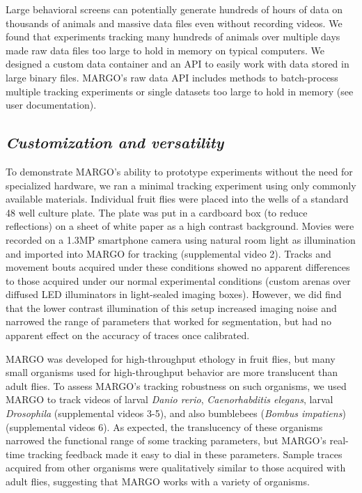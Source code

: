 \documentclass[10pt]{article}
\begin{document}
\begin{multicols}{2}
Large behavioral screens can potentially generate hundreds of hours of data on thousands of animals and massive data files even without recording videos. We found that experiments tracking many hundreds of animals over multiple days made raw data files too large to hold in memory on typical computers. We designed a custom data container and an API to easily work with data stored in large binary files. MARGO's raw data API includes methods to batch-process multiple tracking experiments or single datasets too large to hold in memory (see user documentation). 

\subsection*{\textit{Customization and versatility}}

To demonstrate MARGO's ability to prototype experiments without the need for specialized hardware, we ran a minimal tracking experiment using only commonly available materials. Individual fruit flies were placed into the wells of a standard 48 well culture plate. The plate was put in a cardboard box (to reduce reflections) on a sheet of white paper as a high contrast background. Movies were recorded on a 1.3MP smartphone camera using natural room light as illumination and imported into MARGO for tracking (supplemental video 2). Tracks and movement bouts acquired under these conditions showed no apparent differences to those acquired under our normal experimental conditions (custom arenas over diffused LED illuminators in light-sealed imaging boxes). However, we did find that the lower contrast illumination of this setup increased imaging noise and narrowed the range of parameters that worked for segmentation, but had no apparent effect on the accuracy of traces once calibrated.

MARGO was developed for high-throughput ethology in fruit flies, but many small organisms used for high-throughput behavior are more translucent than adult flies. To assess MARGO’s tracking robustness on such organisms, we used MARGO to track videos of larval \emph{Danio rerio}, \emph{Caenorhabditis elegans}, larval \emph{Drosophila} (supplemental videos 3-5), and also bumblebees (\emph{Bombus impatiens}) (supplemental videos 6). As expected, the translucency of these organisms narrowed the functional range of some tracking parameters, but MARGO's real-time tracking feedback made it easy to dial in these parameters. Sample traces acquired from other organisms were qualitatively similar to those acquired with adult flies, suggesting that MARGO works with a variety of organisms.


\end{multicols}
\end{document}
